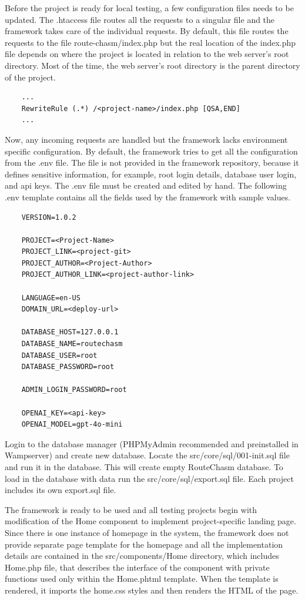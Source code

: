 Before the project is ready for local testing, a few configuration files needs to be updated.
The .htaccess file routes all the requests to a singular file and the framework takes care of the individual requests.
By default, this file routes the requests to the file route-chasm/index.php but the real location of the index.php file
depends on where the project is located in relation to the web server's root directory.
Most of the time, the web server's root directory is the parent directory of the project.

\begin{verbatim}
    ...
    RewriteRule (.*) /<project-name>/index.php [QSA,END]
    ...
\end{verbatim}

Now, any incoming requests are handled but the framework lacks environment specific configuration.
By default, the framework tries to get all the configuration from the .env file.
The file is not provided in the framework repository, because it defines sensitive information, for example, root login details,
database user login, and api keys.
The .env file must be created and edited by hand.
The following .env template contains all the fields used by the framework with sample values.

\begin{verbatim}
    VERSION=1.0.2

    PROJECT=<Project-Name>
    PROJECT_LINK=<project-git>
    PROJECT_AUTHOR=<Project-Author>
    PROJECT_AUTHOR_LINK=<project-author-link>

    LANGUAGE=en-US
    DOMAIN_URL=<deploy-url>

    DATABASE_HOST=127.0.0.1
    DATABASE_NAME=routechasm
    DATABASE_USER=root
    DATABASE_PASSWORD=root

    ADMIN_LOGIN_PASSWORD=root

    OPENAI_KEY=<api-key>
    OPENAI_MODEL=gpt-4o-mini
\end{verbatim}

Login to the database manager (PHPMyAdmin recommended and preinstalled in Wampserver) and create new database.
Locate the src/core/sql/001-init.sql file and run it in the database.
This will create empty RouteChasm database.
To load in the database with data run the src/core/sql/export.sql file.
Each project includes its own export.sql file.

The framework is ready to be used and all testing projects begin with modification of the Home component
to implement project-specific landing page.
Since there is one instance of homepage in the system, the framework does not provide separate page template for
the homepage and all the implementation details are contained in the src/components/Home directory,
which includes Home.php file, that describes the interface of the component with private functions used only
within the Home.phtml template.
When the template is rendered, it imports the home.css styles and then renders the HTML of the page.






